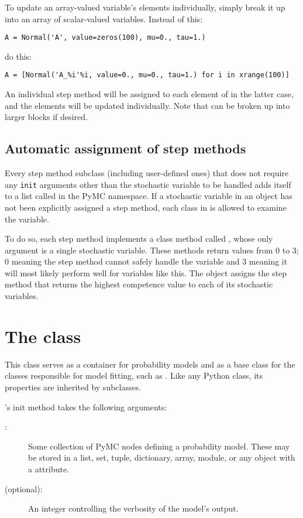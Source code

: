 To update an array-valued variable's elements individually, simply break it up into an array of scalar-valued variables. Instead of this:
\begin{verbatim}
A = Normal('A', value=zeros(100), mu=0., tau=1.)
\end{verbatim}
do this:
\begin{verbatim}
A = [Normal('A_%i'%i, value=0., mu=0., tau=1.) for i in xrange(100)]
\end{verbatim}
An individual step method will be assigned to each element of  in the latter case, and the elements will be updated individually. Note that  can be broken up into larger blocks if desired.

\subsection{Automatic assignment of step methods}
Every step method subclass (including user-defined ones) that does not require any \texttt{init} arguments other than the stochastic variable to be handled adds itself to a list called  in the PyMC namespace. If a stochastic variable in an  object has not been explicitly assigned a step method, each class in  is allowed to examine the variable.

To do so, each step method implements a class method called , whose only argument is a single stochastic variable. These methods return values from 0 to 3; 0 meaning the step method cannot safely handle the variable and 3 meaning it will most likely perform well for variables like this. The  object assigns the step method that returns the highest competence value to each of its stochastic variables.

\hypertarget{model}{}
\section[The Model class]{The  class} \label{sec:Model}
This class serves as a container for probability models and as a base class for the classes responsible for model fitting, such as . Like any Python class, its properties are inherited by subclasses.

's init method takes the following arguments:
\begin{description}
    \item[:] Some collection of PyMC nodes defining a probability model. These may be stored in a list, set, tuple, dictionary, array, module, or any object with a  attribute.
    \item[ (optional):] An integer controlling the verbosity of the model's output.
\end{description}

